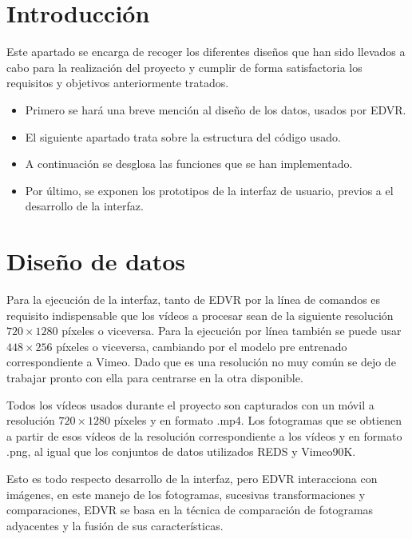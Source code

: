 
\section{Introducción}

Este apartado se encarga de recoger los diferentes diseños que han sido llevados a cabo para la realización del proyecto y cumplir de forma satisfactoria los requisitos y objetivos anteriormente tratados.
	\begin{itemize}
        \item Primero  se hará una breve mención al diseño de los datos, usados por EDVR.
        
        \item El siguiente apartado trata sobre la estructura del código usado.
        
        \item A continuación se desglosa las funciones que se han implementado.

        \item Por último, se exponen los prototipos de la interfaz de usuario, previos a el desarrollo de la interfaz.
    \end{itemize}

\section{Diseño de datos}

Para la ejecución de la interfaz, tanto de EDVR por la línea de comandos es requisito indispensable que los vídeos a procesar sean de la siguiente resolución $720\times 1280$ píxeles o viceversa. Para la ejecución por línea también se puede usar $448 \times 256$ píxeles o viceversa, cambiando por el modelo pre entrenado correspondiente a Vimeo. Dado que es una resolución no muy común se dejo de trabajar pronto con ella para centrarse en la otra disponible.

Todos los vídeos usados durante el proyecto son capturados con un móvil a resolución $720\times 1280$ píxeles y en formato .mp4. Los fotogramas que se obtienen a partir de esos vídeos de la resolución correspondiente a los vídeos y en formato .png, al igual que los conjuntos de datos utilizados REDS y Vimeo90K.

Esto es todo respecto desarrollo de la interfaz, pero EDVR interacciona con imágenes, en este manejo de los fotogramas, sucesivas transformaciones y comparaciones, EDVR se basa en la técnica de comparación de fotogramas adyacentes  y la fusión de sus características.


